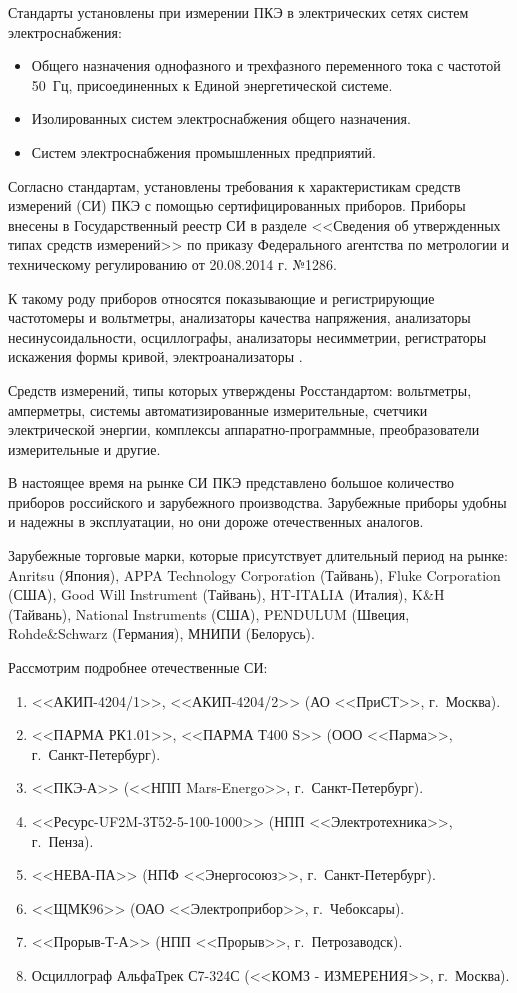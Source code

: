 Стандарты установлены при измерении ПКЭ в электрических сетях систем электроснабжения:
\begin{itemize}
	\item Общего назначения однофазного и трехфазного переменного тока с частотой 50~Гц, присоединенных к Единой энергетической системе.
	\item Изолированных систем электроснабжения общего назначения.
	\item Систем электроснабжения промышленных предприятий.
\end{itemize}

Согласно стандартам, установлены требования к характеристикам средств измерений (СИ) ПКЭ с помощью сертифицированных приборов. Приборы внесены в Государственный реестр СИ в разделе <<Сведения об утвержденных типах средств измерений>> по приказу Федерального агентства по метрологии и техническому регулированию от 20.08.2014 г. №1286.

К такому роду приборов относятся показывающие и регистрирующие частотомеры и вольтметры, анализаторы качества напряжения, анализаторы несинусоидальности, осциллографы, анализаторы несимметрии, регистраторы искажения формы кривой, электроанализаторы \cite{Quality_electricity_1975}.

Средств измерений, типы которых утверждены Росстандартом: вольтметры, амперметры, системы автоматизированные измерительные, счетчики электрической энергии, комплексы аппаратно-программные, преобразователи измерительные и другие.

В настоящее время на рынке СИ ПКЭ представлено большое количество приборов российского и зарубежного производства. Зарубежные приборы удобны и надежны в эксплуатации, но они дороже отечественных аналогов.

Зарубежные торговые марки, которые присутствует длительный период на рынке: Anritsu (Япония), APPA Technology Corporation (Тайвань), Fluke Corporation (США), Good Will Instrument (Тайвань), HT-ITALIA (Италия), K\&H (Тайвань), National Instruments (США), PENDULUM (Швеция, Rohde\&Schwarz (Германия), МНИПИ (Белорусь).

Рассмотрим подробнее отечественные СИ:
\begin{enumerate}
	\item <<АКИП-4204/1>>, <<АКИП-4204/2>> (АО <<ПриСТ>>, г.~Москва).
	\item <<ПАРМА РК1.01>>, <<ПАРМА Т400 S>> (ООО <<Парма>>, г.~Санкт-Петербург).
	\item <<ПКЭ-А>> (<<НПП Mars-Energo>>, г.~Санкт-Петербург).
	\item <<Ресурс-UF2M-3Т52-5-100-1000>> (НПП <<Электротехника>>, г.~Пенза).
	\item <<НЕВА-ПА>> (НПФ <<Энергосоюз>>, г.~Санкт-Петербург).
	\item <<ЩМК96>> (ОАО <<Электроприбор>>, г.~Чебоксары).
	\item <<Прорыв-Т-А>> (НПП <<Прорыв>>, г.~Петрозаводск).
	\item Осциллограф АльфаТрек С7-324С (<<КОМЗ - ИЗМЕРЕНИЯ>>, г.~Москва).
\end{enumerate}

